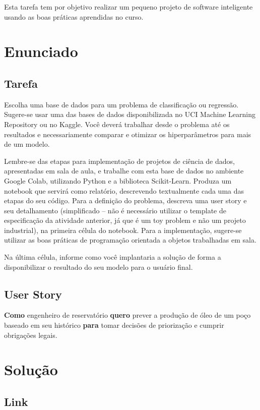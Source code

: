 \documentclass[10pt, a4paper]{article}
\begin{document}
Esta tarefa tem por objetivo realizar um pequeno projeto de software inteligente usando as boas práticas aprendidas no curso.

\section{Enunciado}

\subsection{Tarefa}

Escolha uma base de dados para um problema de classificação ou regressão. Sugere-se usar uma das bases de dados disponibilizada no UCI 
Machine Learning Repository ou no Kaggle. Você deverá trabalhar desde o problema até os resultados e necessariamente comparar e 
otimizar os hiperparâmetros para mais de um modelo.

Lembre-se das etapas para implementação de projetos de ciência de dados, apresentadas em sala de aula, e trabalhe com 
esta base de dados no ambiente Google Colab, utilizando Python e a biblioteca Scikit-Learn. Produza um notebook que servirá 
como relatório, descrevendo textualmente cada uma das etapas do seu código. Para a definição do problema, descreva uma user story 
e seu detalhamento (simplificado – não é necessário utilizar o template de especificação da atividade anterior, já que é um toy problem 
e não um projeto industrial), na primeira célula do notebook. Para a implementação, sugere-se utilizar as boas práticas de programação 
orientada a objetos trabalhadas em sala.

Na última célula, informe como você implantaria a solução de forma a disponibilizar o resultado do seu modelo para o usuário final.

\subsection{User Story}

\textbf{Como} engenheiro de reservatório \textbf{quero} prever a produção de óleo de um poço baseado em seu histórico 
\textbf{para} tomar decisões de priorização e cumprir obrigações legais.

\section{Solução}

\subsection{Link}
\end{document}
